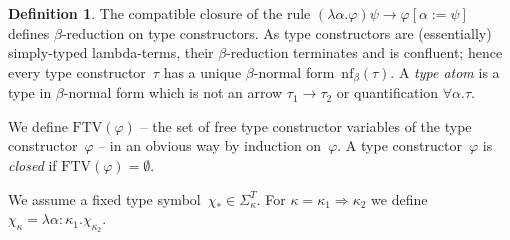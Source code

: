 \documentclass[a4paper,UKenglish,cleveref,autoref,numberwithinsect]{lipics-v2019}
\theoremstyle{definition}
\newtheorem{defn}[theorem]{Definition}
\newcommand{\arrkind}{\Rightarrow}
\newcommand{\arrtype}{\rightarrow}
\newcommand{\FTV}{\mathrm{FTV}}
\newcommand{\nf}{\mathrm{nf}}
\begin{document}
\begin{defn}
  The compatible closure of the rule $(\lambda\alpha.\varphi)\psi \to
  \varphi[\alpha := \psi]$ defines $\beta$-reduction on type
  constructors. As type constructors are (essentially) simply-typed
  lambda-terms, their $\beta$-reduction terminates
  and is confluent; hence every type constructor~$\tau$ has a unique
  $\beta$-normal form~$\nf_\beta(\tau)$. A \emph{type atom} is a type
  in $\beta$-normal form which is not an arrow $\tau_1\arrtype\tau_2$
  or quantification $\forall\alpha.\tau$.

  We define $\FTV(\varphi)$ -- the set of free type constructor
  variables of the type constructor~$\varphi$ -- in an obvious way by
  induction on~$\varphi$. A type constructor~$\varphi$ is
  \emph{closed} if $\FTV(\varphi) = \emptyset$.

  We assume a fixed type symbol~$\chi_* \in
  \Sigma^T_\kappa$. For $\kappa=\kappa_1\arrkind\kappa_2$ we define
  $\chi_\kappa = \lambda \alpha:\kappa_1 . \chi_{\kappa_2}$.
\end{defn}
\end{document}
